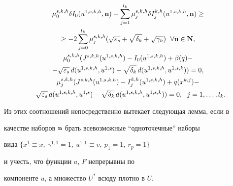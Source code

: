 \begin{gather} 


\mu^{s,k,h}_0\delta I_0(u^{1,s,k,h},\bold n)+ 


\sum^{l_k}_{j=1}\mu^{s,k,h}_j\delta I^{k,h}_j 


(u^{1,s,k,h},\bold n)\ge\notag\\


%


\ge -2\sum^{l_k}_{j=0} 


\mu^{s,k,h}_j(\sqrt{\varepsilon_s}+\sqrt{\delta_k}+ 


\sqrt{\gamma_h})\ \; \forall\bold n\in\bold N,\notag\\ 


% 


\mu^{s,k,h}_0(J^{s,k,h}(u^{1,s,k,h})- 


I_0(u^{1,s,k,h})+\beta(q)-\notag\\


%


-\sqrt{\varepsilon_s}\, 


d(u^{1,s,k,h},u^{1,s})-\sqrt{\delta_k}\, 


d(u^{1,s,k,h},u^{1,s,k}))=0,\\ 


% 


\mu^{s,k,h}_j(J^{s,k,h}(u^{1,s,k,h})- 


I^{k,h}_j(u^{1,s,k,h})+q(x^{k,j})- \notag\\


%


-\sqrt{\varepsilon_s}\,d(u^{1,s,k,h},u^{1,s})- 


\sqrt{\delta_k}\,d(u^{1,s,k,h},u^{1,s,k}))=0, 


\ \; j=1,\dotsc,l_k.\notag 


\end{gather} 


Из этих соотношений непосредственно вытекает следующая лемма, если в 


качестве наборов $\bold n$ брать всевозможные ``одноточечные'' наборы 


вида $\{x^1\equiv x,\ \gamma^{1,1}=1,\ u^{1,1}\equiv v,\ p_1=1,\ 


r_p=1\}$ 


и учесть, что функции $a$, $F$ непрерывны по 


компоненте $u$, а множество $U^*$ всюду плотно в $U$. 


 


